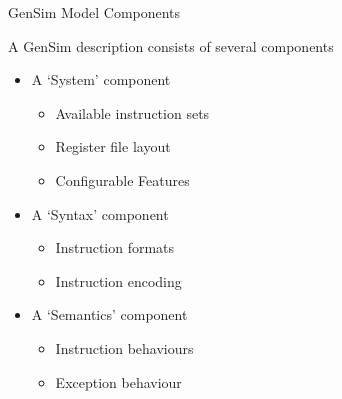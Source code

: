 \begin{frame}{GenSim Model Components}

A GenSim description consists of several components
\begin{itemize}
\pause
\item A `System' component
\begin{itemize}
\item Available instruction sets
\item Register file layout
\item Configurable Features
\end{itemize}
\pause
\item A `Syntax' component
\begin{itemize}
\item Instruction formats
\item Instruction encoding
\end{itemize}
\pause
\item A `Semantics' component
\begin{itemize}
\item Instruction behaviours
\item Exception behaviour
\end{itemize}

\end{itemize}

\end{frame}


